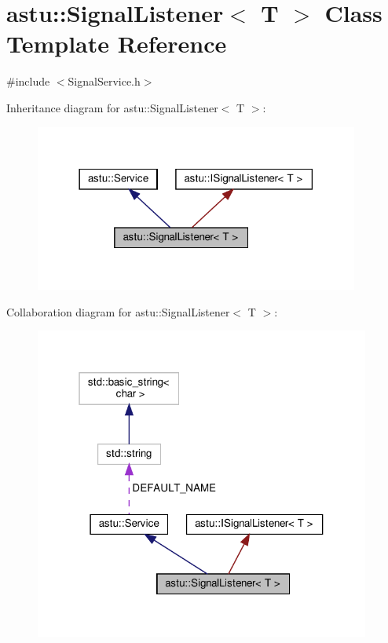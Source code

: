 \hypertarget{classastu_1_1SignalListener}{}\section{astu\+:\+:Signal\+Listener$<$ T $>$ Class Template Reference}
\label{classastu_1_1SignalListener}


{\ttfamily \#include $<$Signal\+Service.\+h$>$}



Inheritance diagram for astu\+:\+:Signal\+Listener$<$ T $>$\+:\nopagebreak
\begin{figure}[H]
\begin{center}
\leavevmode
\includegraphics[width=302pt]{classastu_1_1SignalListener__inherit__graph}
\end{center}
\end{figure}


Collaboration diagram for astu\+:\+:Signal\+Listener$<$ T $>$\+:\nopagebreak
\begin{figure}[H]
\begin{center}
\leavevmode
\includegraphics[width=313pt]{classastu_1_1SignalListener__coll__graph}
\end{center}
\end{figure}
